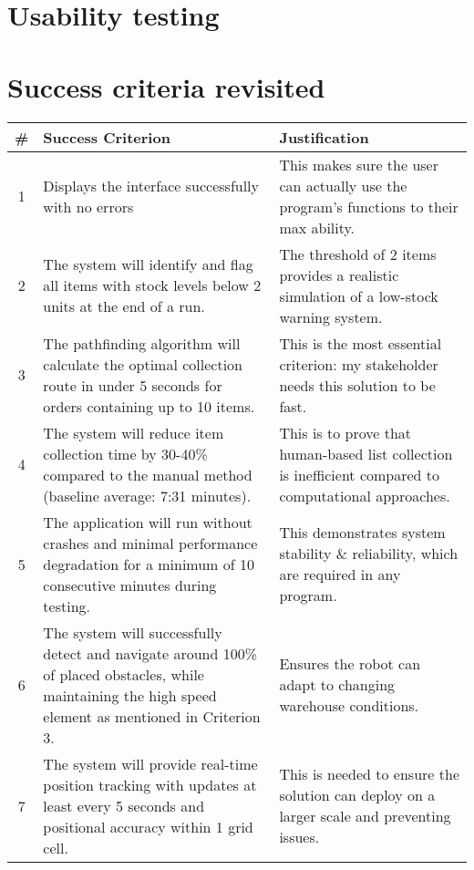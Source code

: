 \newpage

\section{Usability testing}

\newpage

\section{Success criteria revisited}

\begin{table}[htbp!]
	\centering
	\begin{tabularx}{\textwidth}{|c|X|X|}
		\hline
		\textbf{\#} & \textbf{Success Criterion} & \textbf{Justification} \\
		\hline
		1 & Displays the interface successfully with no errors & This makes sure the user can actually use the program's functions to their max ability. \\
		\hline
		2 & The system will identify and flag all items with stock levels below 2 units at the end of a run. & The threshold of 2 items provides a realistic simulation of a low-stock warning system. \\
		\hline
		3 & The pathfinding algorithm will calculate the optimal collection route in under 5 seconds for orders containing up to 10 items. & This is the most essential criterion: my stakeholder needs this solution to be fast. \\
		\hline
		4 & The system will reduce item collection time by 30-40\% compared to the manual method (baseline average: 7:31 minutes). & This is to prove that human-based list collection is inefficient compared to computational approaches. \\
		\hline
		5 & The application will run without crashes and minimal performance degradation for a minimum of 10 consecutive minutes during testing. & This demonstrates system stability \& reliability, which are required in any program. \\
		\hline
		6 & The system will successfully detect and navigate around 100\% of placed obstacles, while maintaining the high speed element as mentioned in Criterion 3. & Ensures the robot can adapt to changing warehouse conditions. \\
		\hline
		7 & The system will provide real-time position tracking with updates at least every 5 seconds and positional accuracy within 1 grid cell. & This is needed to ensure the solution can deploy on a larger scale and preventing issues. \\

\end{tabularx}
\end{table}
